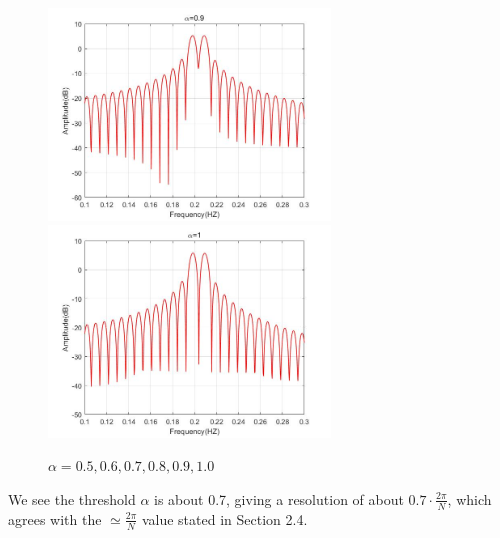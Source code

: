 \documentclass[UTF-8, a4paper, 12pt]{ctexart}
\begin{document}
\begin{figure}[htbp]
    \includegraphics[width=7.5cm]{2/alpha09.jpg}
    \includegraphics[width=7.5cm]{2/alpha10.jpg}
    \caption{$\alpha=0.5, 0.6, 0.7, 0.8, 0.9, 1.0$}
\end{figure}

We see the threshold $\alpha$ is about 0.7, giving a resolution of about $0.7\cdot\frac{2\pi}{N}$, which agrees with the $\simeq \frac{2\pi}{N}$ value stated in Section 2.4.
\end{document}
